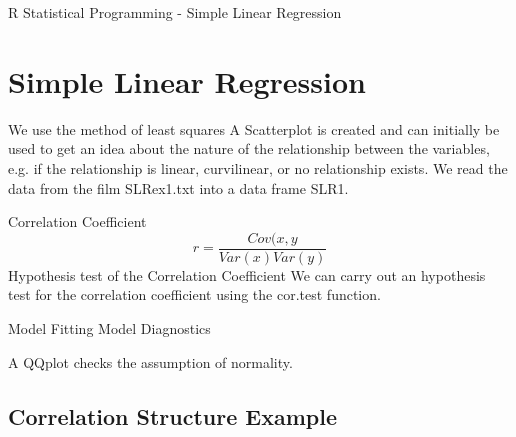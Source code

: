 R Statistical Programming - Simple Linear Regression
 
\section{Simple Linear Regression}
We use the method of least squares
A Scatterplot is created and can initially be used to get an idea
about the nature of the relationship between the variables, e.g. if the
relationship is linear, curvilinear, or no relationship exists.
We read the data from the film SLRex1.txt into a data frame SLR1.

Correlation Coefficient
\[r = \frac{Cov(x,y}{Var(x)Var(y)}\]
Hypothesis test of the Correlation Coefficient
We can carry out an hypothesis test for the correlation coefficient
using the cor.test function.

Model Fitting
Model Diagnostics
 
A QQplot checks the assumption of normality.
 


\subsection{Correlation Structure Example}








